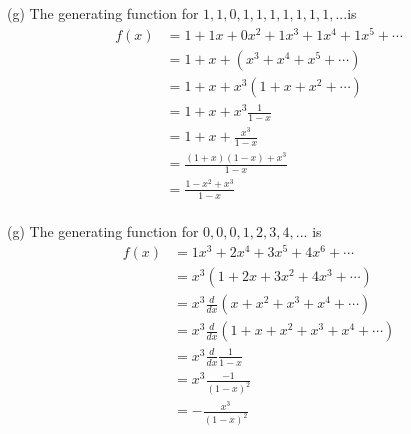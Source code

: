 (g)
The generating function for
$1, 1, 0, 1, 1, 1, 1, 1, 1, 1, ...$is
\begin{align*}
f(x) &= 1 + 1x + 0x^2 + 1x^3 + 1x^4 + 1x^5 + \cdots \\
     &= 1 + x + (x^3 + x^4 + x^5 + \cdots ) \\
     &= 1 + x + x^3(1 + x + x^2 + \cdots ) \\
     &= 1 + x + x^3\frac{1}{1 - x} \\
     &= 1 + x + \frac{x^3}{1 - x} \\
     &= \frac{(1 + x)(1 - x) + x^3}{1 - x} \\
     &= \frac{1 - x^2 + x^3}{1 - x} \\
\end{align*}




(g)
The generating function for
$0, 0, 0, 1, 2, 3, 4, ...$ is
\begin{align*}
f(x) &= 1x^3 + 2x^4 + 3x^5 + 4x^6 + \cdots \\
     &= x^3(1 + 2x + 3x^2 + 4x^3 + \cdots) \\
     &= x^3\frac{d}{dx}(x + x^2 + x^3 + x^4 + \cdots) \\
     &= x^3\frac{d}{dx}(1 + x + x^2 + x^3 + x^4 + \cdots) \\
     &= x^3\frac{d}{dx}\frac{1}{1 - x} \\
     &= x^3\frac{-1}{(1 - x)^2} \\
     &= -\frac{x^3}{(1 - x)^2} \\
\end{align*}
